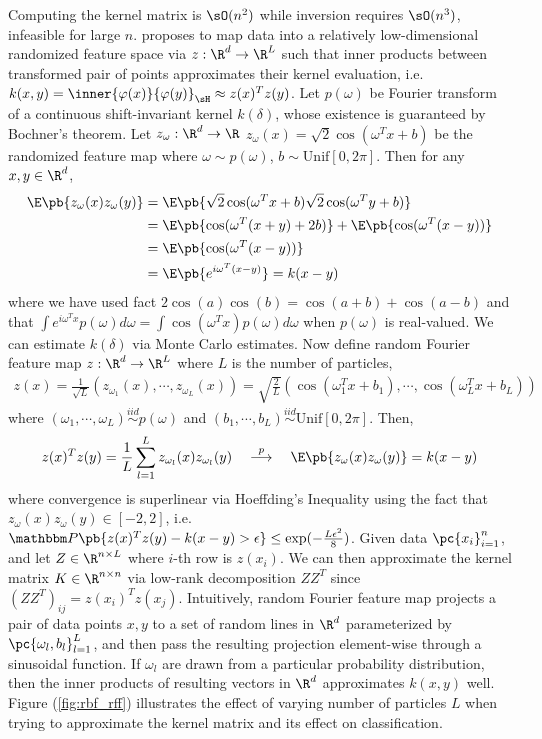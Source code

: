 \documentclass[11pt]{article}
\begin{document}
Computing the kernel matrix is $\sO(n^2)$ while inversion requires $\sO(n^3)$, infeasible for large $n$. \cite{rahimiRandomFeaturesLargeScale2007} proposes to map data into a relatively low-dimensional randomized feature space via $z:\R^d\to\R^L$ such that inner products between transformed pair of points approximates their kernel evaluation, i.e. $k(x,y) = \inner{\varphi(x)}{\varphi(y)}_{\sH} \approx z(x)^Tz(y)$. Let $p(\omega)$ be Fourier transform of a continuous shift-invariant kernel $k(\delta)$, whose existence is guaranteed by Bochner's theorem. Let $z_{\omega}:\R^d\to \R$ $z_{\omega}(x) = \sqrt{2}\cos(\omega^Tx+b)$ be the randomized feature map where $\omega\sim p(\omega)$, $b\sim \text{Unif}[0,2\pi]$. Then for any $x,y\in\R^d$,
\begin{align}
    \E\pb{z_{\omega}(x)z_{\omega}(y)}
        &= \E\pb{ \sqrt{2} \cos(\omega^T x + b) \sqrt{2}\cos(\omega^Ty+b) } \\
        &= \E\pb{ \cos(\omega^T(x+y)+2b) } + \E\pb{ \cos(\omega^T(x-y)) } \\
        &= \E\pb{ \cos(\omega^T(x-y)) } \\
        &= \E\pb{ e^{i\omega^T(x-y)} } = k(x-y)
\end{align}
where we have used fact $2\cos(a)\cos(b)=\cos(a+b)+\cos(a-b)$ and that $\int e^{i\omega^Tx} p(\omega)d\omega = \int \cos(\omega^Tx) p(\omega)d\omega$ when $p(\omega)$ is real-valued. We can estimate $k(\delta)$ via Monte Carlo estimates. Now define random Fourier feature map $z:\R^d\to\R^L$ where $L$ is the number of particles,
\begin{align}
    z(x)
        = \frac{1}{\sqrt{L}} (z_{\omega_1}(x), \cdots, z_{\omega_L}(x)) 
        = \sqrt{\frac{2}{L}}(\cos(\omega_1^Tx+b_1), \cdots, \cos(\omega_L^Tx+b_L))
\end{align}
where $(\omega_1,\cdots,\omega_L) \overset{iid}{\sim} p(\omega)$ and $(b_1,\cdots,b_L)\overset{iid}{\sim} \text{Unif}[0,2\pi]$. Then,
\begin{align}
    z(x)^Tz(y)
        = \frac{1}{L} \sum_{l=1}^L z_{\omega_l}(x) z_{\omega_l}(y)
        \quad\overset{p}{\longrightarrow}\quad 
        \E\pb{z_{\omega}(x)z_{\omega}(y)}
        = k(x-y)
\end{align}
where convergence is superlinear via Hoeffding's Inequality using the fact that $z_{\omega}(x)z_{\omega}(y) \in [-2,2]$, i.e. $\bbP\pb{ z(x)^Tz(y) - k(x-y) > \epsilon } \leq \exp(-\frac{L\epsilon^2}{8})$. Given data $\pc{x_i}_{i=1}^n$, and let $Z\in\R^{n\times L}$ where $i$-th row is $z(x_i)$. We can then approximate the kernel matrix $K\in\R^{n\times n}$ via low-rank decomposition $ZZ^T$ since $(ZZ^T)_{ij} = z(x_i)^T z(x_j)$. Intuitively, random Fourier feature map projects a pair of data points $x,y$ to a set of random lines in $\R^d$ parameterized by $\pc{\omega_l,b_l}_{l=1}^L$, and then pass the resulting projection element-wise through a sinusoidal function. If $\omega_l$ are drawn from a particular probability distribution, then the inner products of resulting vectors in $\R^d$ approximates $k(x,y)$ well. Figure (\ref{fig:rbf_rff}) illustrates the effect of varying number of particles $L$ when trying to approximate the kernel matrix and its effect on classification.
\end{document}
